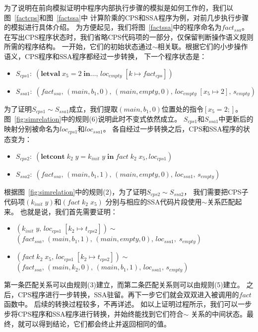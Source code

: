 为了说明在前向模拟证明中程序内部执行步骤的模拟是如何工作的，我们以图~\ref{factcps}和图~\ref{factssa}中
计算阶乘的CPS和SSA程序为例，对前几步执行步骤的模拟进行具体介绍。
为方便起见，我们将图~\ref{factssa}中的程序命名为$fact_{ssa}$。
在写出CPS程序状态时，我们省略CPS代码项的一部分，仅保留判断操作语义规则所需的程序结构。
一开始，它们的初始状态通过$\sim$相关联。根据它们的小步操作语义，CPS程序和SSA程序都经过一步转换，
下一个程序状态是：

\begin{itemize}
    \item $S_{cps1}:\; (\mathbf{letval}\; x_5=2\; \mathbf{in}\dots,\, loc_{empty}\; [k\mapsto fact_{cps}])$
    \item $S_{ssa1}:\; (fact_{ssa},\, (main, b_1, 0),\, (main, empty, 0),\, loc_{empty}\; [x_5\mapsto 2],\, s_{empty})$
\end{itemize}

为了证明$S_{cps1}\sim S_{ssa1}$成立，我们提取$(main, b_1, 0)$位置处的指令$[x_5 = 2;]$。
图~\ref{fig:simrelation}中的规则(6)说明此时不变式依然成立。
$S_{cps1}$和$S_{ssa1}$中更新后的映射分别被命名为$loc_{cps1}$和$loc_{ssa1}$。
各自经过一步转换之后，CPS和SSA程序的状态变为：

\begin{itemize}
    \item $S_{cps2}:\; (\mathbf{letcont}\; k_2\; y=k_{init}\; y\; \mathbf{in}\; fact\; k_2\; x_5, loc_{cps1})$
    \item $S_{ssa2}:\; (fact_{ssa},\, (main, b_1, 1),\, (main, empty, 0),\, loc_{ssa1},\, s_{empty})$
\end{itemize}

根据图~\ref{fig:simrelation}中的规则(2)，为了证明$S_{cps2}\sim S_{ssa2}$，
我们需要把CPS子代码项$(k_{init}\; y)$和$(fact\; k_2\; x_5)$
分别与相应的SSA代码片段使用$\sim$关系匹配起来。
也就是说，我们首先需要证明：

\begin{itemize}
    \item $(k_{init}\; y,\, loc_{cps1}\; [k_2\mapsto t_{cps2}])\sim $ \\ $(fact_{ssa},\, (main, b_1, 1),\, (main, empty, 0),\, loc_{ssa1},\; s_{empty})$
    \item $ (fact\; k_2\; x_5,\, loc_{cps1}\; [k_2\mapsto t_{cps2}])\sim $ \\ $(fact_{ssa},\, (main, k_2, 0),\, (main, b_1,1),\, loc_{ssa1},\, s_{empty})$
\end{itemize}

第一条匹配关系可以由规则(3)建立，而第二条匹配关系则可以由规则(5)建立。
之后，CPS程序进行一步转换，SSA驻留。再下一步它们就会双双进入被调用的$fact$函数中。
后续的转换过程较多，不再详述。
如以上证明过程所示，我们可以一步步将CPS程序和SSA程序进行转换，并始终能找到它们符合$\sim$
关系的中间状态。最终，就可以得到结论，它们都会终止并返回相同的值。

